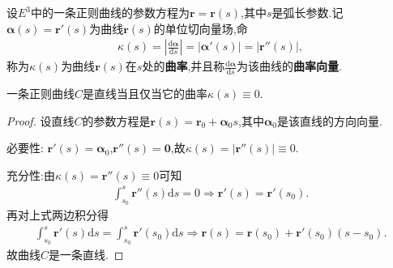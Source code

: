 \documentclass[../../main.tex]{subfiles}%
\begin{document}
\begin{definition}[曲率与曲率向量]
设$E^3$中的一条正则曲线的参数方程为$\bm{r}=\bm{r}(s)$,其中$s$是弧长参数.记$\bm{\alpha}(s)=\bm{r}'(s)$为曲线$\bm{r}(s)$的单位切向量场,命
\begin{align*}
\kappa \left( s \right) =\left| \frac{\mathrm{d}\boldsymbol{\alpha }}{\mathrm{d}s} \right|=|\bm{\alpha}'(s)|=\left| \boldsymbol{r}'' \left( s \right) \right|,
\end{align*}
称为$\kappa \left( s \right)$为曲线$\bm{r}(s)$在$s$处的\textbf{曲率},并且称$\frac{\mathrm{d}\bm{\alpha}}{\mathrm{d}s}$为该曲线的\textbf{曲率向量}.
\end{definition}

\begin{theorem}\label{theorem:正则曲线是直线等价于曲率为0}
一条正则曲线$C$是直线当且仅当它的曲率$\kappa(s)\equiv 0$.
\end{theorem}
\begin{proof}

设直线$C$的参数方程是$\bm{r}(s)=\bm{r}_0+\bm{\alpha}_0 s$,其中$\bm{\alpha}_0$是该直线的方向向量.

{\heiti 必要性:}
$\bm{r}'(s)=\bm{\alpha}_0$,$\bm{r}''(s)=\bm{0}$,故$\kappa(s)=|\bm{r}''(s)|\equiv 0$.

{\heiti 充分性:}由$\kappa(s)=\bm{r}''(s)\equiv 0$可知
\begin{align*}
\int_{s_0}^s \bm{r}''(s)\mathrm{d}s=0\Longrightarrow \bm{r}'(s)=\bm{r}'(s_0).
\end{align*}
再对上式两边积分得
\begin{align*}
\int_{s_0}^s \bm{r}'(s)\mathrm{d}s=\int_{s_0}^s \bm{r}'(s_0)\mathrm{d}s\Longrightarrow \bm{r}(s)=\bm{r}(s_0)+\bm{r}'(s_0)(s-s_0).
\end{align*}
故曲线$C$是一条直线.

\end{proof}
\end{document}
